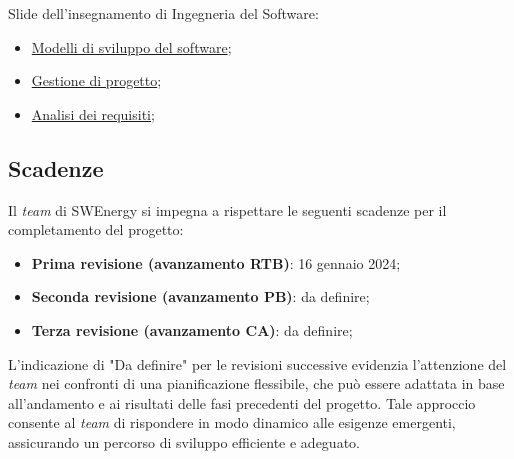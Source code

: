 Slide dell'insegnamento di Ingegneria del Software:
\begin{itemize}
	\item \href{https://www.math.unipd.it/~tullio/IS-1/2023/Dispense/T3.pdf}
	      {Modelli di sviluppo del software};
	\item \href{https://www.math.unipd.it/~tullio/IS-1/2023/Dispense/T4.pdf}
	      {Gestione di progetto};
	\item \href{https://www.math.unipd.it/~tullio/IS-1/2023/Dispense/T5.pdf}
	      {Analisi dei requisiti};
\end{itemize}

\subsection{Scadenze}
Il \textit{team} di SWEnergy si impegna a rispettare le seguenti scadenze per il
completamento del progetto:
\begin{itemize}
	\item \textbf{Prima revisione (avanzamento RTB)}: 16 gennaio 2024;
	\item \textbf{Seconda revisione (avanzamento PB)}: da definire;
	\item \textbf{Terza revisione (avanzamento CA)}: da definire;
\end{itemize}

L'indicazione di "Da definire" per le revisioni successive evidenzia l'attenzione 
del \textit{team} nei confronti di una pianificazione flessibile, che può essere 
adattata in base all'andamento e ai risultati delle fasi precedenti del progetto. 
Tale approccio consente al \textit{team} di rispondere in modo dinamico alle esigenze emergenti, 
assicurando un percorso di sviluppo efficiente e adeguato.
